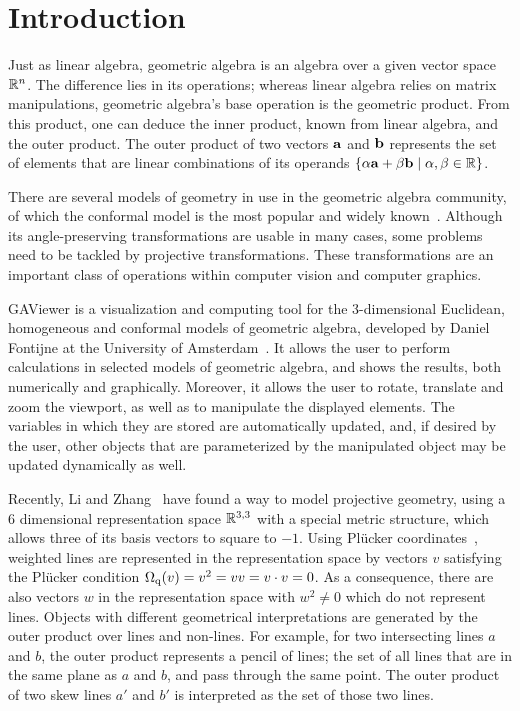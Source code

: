 \section{Introduction}
\label{ch:introduction}
Just as linear algebra, geometric algebra is an algebra over a given vector space $\mathbb{R}^n$.  The difference lies in its operations; whereas linear algebra relies on matrix manipulations, geometric algebra's base operation is the geometric product.  From this product, one can deduce the inner product, known from linear algebra, and the outer product.  The outer product of two vectors $\mathbf{a}$ and $\mathbf{b}$ represents the set of elements that are linear combinations of its operands $\left\{\alpha \mathbf{a} + \beta \mathbf{b} \mid \alpha, \beta \in \mathbb{R} \right\}$.

There are several models of geometry in use in the geometric algebra community, of which the conformal model is the most popular and widely known~\cite{TheBook}.  Although its angle-preserving transformations are usable in many cases, some problems need to be tackled by projective transformations.  These transformations are an important class of operations within computer vision and computer graphics. 

GAViewer is a visualization and computing tool for the 3-dimensional Euclidean, homogeneous and conformal models of geometric algebra, developed by Daniel Fontijne at the University of Amsterdam~\cite{GAViewer}.  It allows the user to perform calculations in selected models of geometric algebra, and shows the results, both numerically and graphically.  Moreover, it allows the user to rotate, translate and zoom the viewport, as well as to manipulate the displayed elements.  The variables in which they are stored are automatically updated, and, if desired by the user, other objects that are parameterized by the manipulated object may be updated dynamically as well.

Recently, Li and Zhang~\cite{Hongbo} have found a way to model projective geometry, using a 6 dimensional representation space $\mathbb{R}^{3,3}$ with a special metric structure, which allows three of its basis vectors to square to $-1$.  Using Pl\"ucker coordinates~\cite{TheBook,Hongbo,Pottmann,Shoemake}, weighted lines are represented in the representation space by vectors $v$ satisfying the Pl\"ucker condition $\operatorname{\Omega_q}(v) = v^2 = v v = v \mathbin{\cdot} v = 0$.  As a consequence, there are also vectors $w$ in the representation space with $w^2 \not= 0$ which do not represent lines.  Objects with different geometrical interpretations are generated by the outer product over lines and non-lines.  For example, for two intersecting lines $a$ and $b$, the outer product represents a pencil of lines; the set of all lines that are in the same plane as $a$ and $b$, and pass through the same point.  The outer product of two skew lines $a'$ and $b'$ is interpreted as the set of those two lines.

